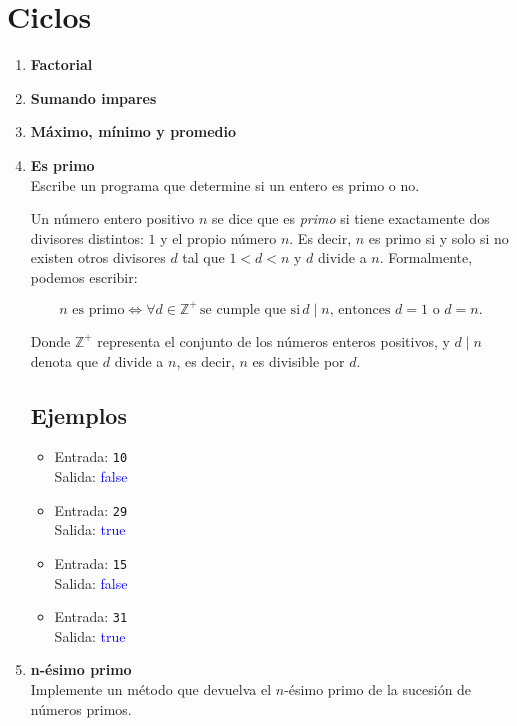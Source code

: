 \section{Ciclos}
\begin{enumerate}
    \item \textbf{Factorial}\\
    

    \item \textbf{Sumando impares}\\
    

    \item \textbf{Máximo, mínimo y promedio}\\
    

    \item \textbf{Es primo}\\
    Escribe un programa que determine si un entero es primo o no.
    
    Un número entero positivo \( n \) se dice que es \textit{primo} si tiene exactamente dos divisores distintos: \( 1 \) y el propio número \( n \). Es decir, \( n \) es primo si y solo si no existen otros divisores \( d \) tal que \( 1 < d < n \) y \( d \) divide a \( n \). Formalmente, podemos escribir:

    \[
    n \text{ es primo} \iff \forall d \in \mathbb{Z}^+ \, \text{se cumple que si} \, d \mid n \text{, entonces } d = 1 \text{ o } d = n.
    \]
    
    Donde \( \mathbb{Z}^+ \) representa el conjunto de los números enteros positivos, y \( d \mid n \) denota que \( d \) divide a \( n \), es decir, \( n \) es divisible por \( d \).
    \subsection*{Ejemplos}
    \begin{itemize}
        \item Entrada: \texttt{10}\\
              Salida: \textcolor{blue}{false}
        \item Entrada: \texttt{29}\\
              Salida: \textcolor{blue}{true}
        \item Entrada: \texttt{15}\\
              Salida: \textcolor{blue}{false}
        \item Entrada: \texttt{31}\\
              Salida: \textcolor{blue}{true}
    \end{itemize}
    \item \textbf{n-ésimo primo}\\
    Implemente un método que devuelva el $n$-ésimo primo de la sucesión de números primos.

\end{enumerate}
